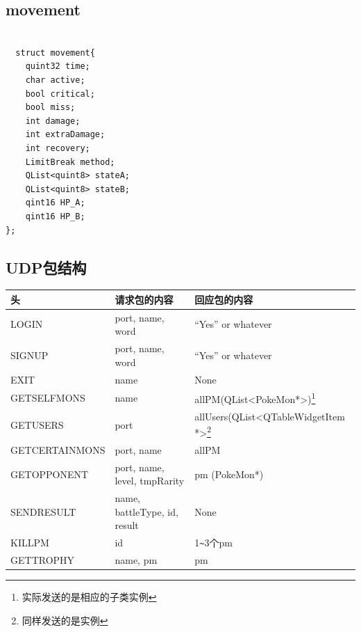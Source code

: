 \documentclass{article}
\begin{document}
\subsection{movement}
\label{app:movement}
\begin{verbatim}

  struct movement{
    quint32 time;
    char active;
    bool critical;
    bool miss;
    int damage;
    int extraDamage;
    int recovery;
    LimitBreak method;
    QList<quint8> stateA;
    QList<quint8> stateB;
    qint16 HP_A;
    qint16 HP_B;
};
\end{verbatim}

\subsection{UDP包结构}
\label{app:udp}
\begin{center}
  \begin{tabular}{|l|l|l|}
    \hline
    头 & 请求包的内容 & 回应包的内容\\ \hline
    LOGIN & port, name, word & ``Yes'' or whatever\\
    SIGNUP & port, name, word & ``Yes'' or whatever\\
    EXIT & name & None\\
    GETSELFMONS & name & allPM(QList<PokeMon*>)\footnote{实际发送的是相应的子类实例}\\
    GETUSERS & port & allUsers(QList<QTableWidgetItem *>\footnote{同样发送的是实例}\\
    GETCERTAINMONS & port, name & allPM\\
    GETOPPONENT & port, name, level, tmpRarity & pm (PokeMon*)\\
    SENDRESULT & name, battleType, id, result & None\\
    KILLPM & id & 1\verb|~|3个pm\\
    GETTROPHY & name, pm & pm\\
   
    \hline
  \end{tabular}
\end{center}
\end{document}
